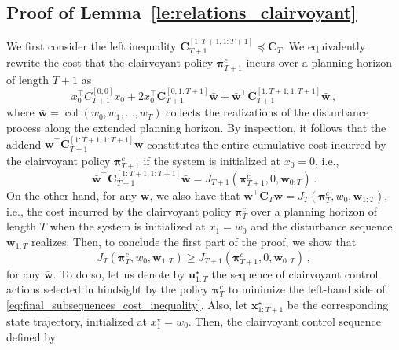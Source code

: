 \documentclass[conference]{IEEEtran}
\begin{document}
\subsection{Proof of Lemma~\ref{le:relations_clairvoyant}}
\label{app:proof_relations_clairvoyant}
    We first consider the left inequality $\mathbf{C}_{T+1}^{[1:T+1, 1:T+1]} \preceq \mathbf{C}_{T}$. We equivalently rewrite the cost that the clairvoyant policy $\bm{\pi}_{T+1}^c$ incurs over a planning horizon of length $T+1$ as
    \begin{equation*}
        x_0^\top C_{T+1}^{[0, 0]} x_0 + 2 x_0^\top \mathbf{C}_{T+1}^{[0, 1:T+1]} \bar{\mathbf{w}} + \bar{\mathbf{w}}^\top \mathbf{C}_{T+1}^{[1:T+1, 1:T+1]} \bar{\mathbf{w}}\,,
    \end{equation*}
    where $\bar{\mathbf{w}} = \operatorname{col}(w_0, w_1, \dots, w_T)$ collects the realizations of the disturbance process along the extended planning horizon. By inspection, it follows that the addend $\bar{\mathbf{w}}^\top \mathbf{C}_{T+1}^{[1:T+1, 1:T+1]} \bar{\mathbf{w}}$ constitutes the entire cumulative cost incurred by the clairvoyant policy $\bm{\pi}^c_{T+1}$
    if the system is initialized at $x_0 = 0$, i.e.,
    \begin{equation*}
        \bar{\mathbf{w}}^\top \mathbf{C}_{T+1}^{[1:T+1, 1:T+1]} \bar{\mathbf{w}} = J_{T+1}(\bm{\pi}_{T+1}^c, 0, \mathbf{w}_{0:T})\,.
    \end{equation*}
    On the other hand, for any $\bar{\mathbf{w}}$, we also have that $\bar{\mathbf{w}}^\top \mathbf{C}_T \bar{\mathbf{w}} = J_{T}(\bm{\pi}_{T}^c, w_{0}, \mathbf{w}_{1:T})$,
    i.e., the cost incurred by the clairvoyant policy $\bm{\pi}_{T}^c$ over a planning horizon of length $T$ when the system is initialized at $x_{1} = w_{0}$ and the disturbance sequence $\mathbf{w}_{1:T}$ realizes. Then, to conclude the first part of the proof, we show that
    \begin{equation}
        \label{eq:final_subsequences_cost_inequality}
        J_{T}(\bm{\pi}_{T}^c, w_{0}, \mathbf{w}_{1:T}) \geq J_{T+1}(\bm{\pi}_{T+1}^c, 0, \mathbf{w}_{0:T})\,,
    \end{equation}
    for any $\bar{\mathbf{w}}$. To do so, let us denote by $\mathbf{u}^\star_{1:T}$ the sequence of clairvoyant control actions selected in hindsight by the policy $\bm{\pi}_{T}^c$ to minimize the left-hand side of \eqref{eq:final_subsequences_cost_inequality}. Also, let $\mathbf{x}^\star_{1:T+1}$ be the corresponding state trajectory, initialized at $x^\star_{1} = w_{0}$. Then, the clairvoyant control sequence defined by
\end{document}
